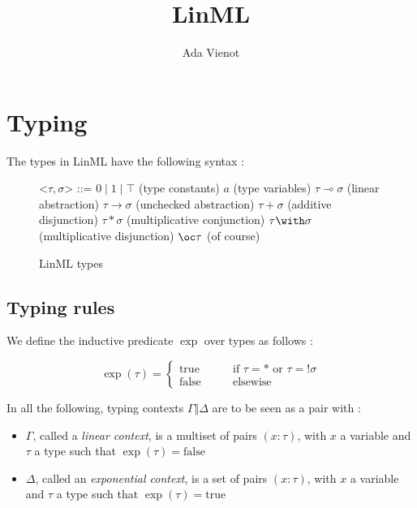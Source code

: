 \documentclass{article}
\begin{document}
\title{LinML}
\author{Ada Vienot}
\date{}

\maketitle

\section{Typing}

The types in LinML have the following syntax :

\begin{figure}[!h]
    \centering
    \begin{minipage}{0.7\linewidth}
        \setlength{\grammarindent}{3.8em}
        \begin{grammar}
            \let\syntleft\relax
            \let\syntright\relax
            <$\tau, \sigma$> ::= 
                $0 \mid 1 \mid \top$ \hfill (type constants)
                \alt $a$ \hfill (type variables)
                \alt $\tau \multimap \sigma$ \hfill (linear abstraction)
                \alt $\tau \to \sigma$ \hfill (unchecked abstraction)
                \alt $\tau + \sigma$ \hfill (additive disjunction)
                \alt $\tau * \sigma$ \hfill (multiplicative conjunction)
                \alt $\tau \with \sigma$ \hfill (multiplicative disjunction)
                \alt $\oc\tau$ \hfill (of course)
        \end{grammar}
    \end{minipage}
    \caption{LinML types}
    \label{types}
\end{figure}

\subsection{Typing rules}

We define the inductive predicate $\operatorname{exp}$ over types as follows :

$$
\operatorname{exp}(\tau) = 
\left \{
\begin{aligned}
    \mathrm{true} \qquad &\text{if } \tau = * \text{ or } \tau = !\sigma\\
    \mathrm{false} \qquad &\text{elsewise}
\end{aligned}
\right.
$$

In all the following, typing contexts $\Gamma \Vert \Delta$ are to be seen as a pair with :
\begin{itemize}
    \item $\Gamma$, called a \textit{linear context}, is a multiset of pairs $(x : \tau)$, with $x$ a variable and $\tau$ a type such that $\operatorname{exp}(\tau) = \mathrm{false}$
    
    \item $\Delta$, called an \textit{exponential context}, is a set of pairs $(x : \tau)$, with $x$ a variable and $\tau$ a type such that $\operatorname{exp}(\tau) = \mathrm{true}$    
\end{itemize}
\end{document}
